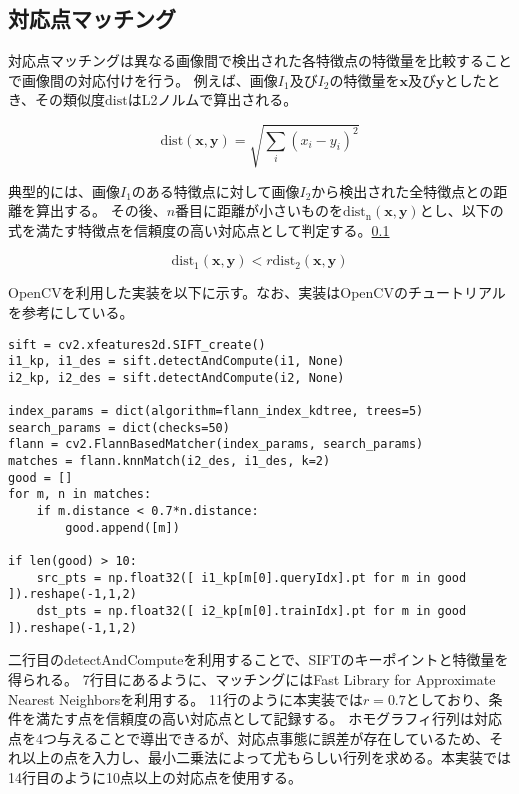 \subsection{対応点マッチング}
対応点マッチングは異なる画像間で検出された各特徴点の特徴量を比較することで画像間の対応付けを行う。
例えば、画像$I_1$及び$I_2$の特徴量を$\bm{x}$及び$\bm{y}$としたとき、その類似度$\mathrm{dist}$はL2ノルムで算出される。

\begin{equation}
    \mathrm{dist}(\bm{x}, \bm{y}) = \sqrt{\sum_{i}(x_i - y_i)^2}
\end{equation}

典型的には、画像$I_1$のある特徴点に対して画像$I_2$から検出された全特徴点との距離を算出する。
その後、$n$番目に距離が小さいものを$\mathrm{dist_n}(\bm{x}, \bm{y})$とし、以下の式を満たす特徴点を信頼度の高い対応点として判定する。\ref{}

\begin{equation}
    \mathrm{dist_1}(\bm{x}, \bm{y}) < r \mathrm{dist_2}(\bm{x}, \bm{y})
\end{equation}

OpenCVを利用した実装を以下に示す。なお、実装はOpenCVのチュートリアル\cite{http://labs.eecs.tottori-u.ac.jp/sd/Member/oyamada/OpenCV/html/py_tutorials/py_feature2d/py_matcher/py_matcher.html}を参考にしている。

\begin{lstlisting}[caption=対応点マッチング, label=py:sift_match]
sift = cv2.xfeatures2d.SIFT_create()
i1_kp, i1_des = sift.detectAndCompute(i1, None)
i2_kp, i2_des = sift.detectAndCompute(i2, None)

index_params = dict(algorithm=flann_index_kdtree, trees=5)
search_params = dict(checks=50)
flann = cv2.FlannBasedMatcher(index_params, search_params)
matches = flann.knnMatch(i2_des, i1_des, k=2)
good = []
for m, n in matches:
    if m.distance < 0.7*n.distance:
        good.append([m])

if len(good) > 10:
    src_pts = np.float32([ i1_kp[m[0].queryIdx].pt for m in good ]).reshape(-1,1,2)
    dst_pts = np.float32([ i2_kp[m[0].trainIdx].pt for m in good ]).reshape(-1,1,2)
\end{lstlisting}
二行目のdetectAndComputeを利用することで、SIFTのキーポイントと特徴量を得られる。
7行目にあるように、マッチングにはFast Library for Approximate Nearest Neighborsを利用する。
11行のように本実装では$r=0.7$としており、条件を満たす点を信頼度の高い対応点として記録する。
ホモグラフィ行列は対応点を4つ与えることで導出できるが、対応点事態に誤差が存在しているため、それ以上の点を入力し、最小二乗法によって尤もらしい行列を求める。本実装では14行目のように10点以上の対応点を使用する。

